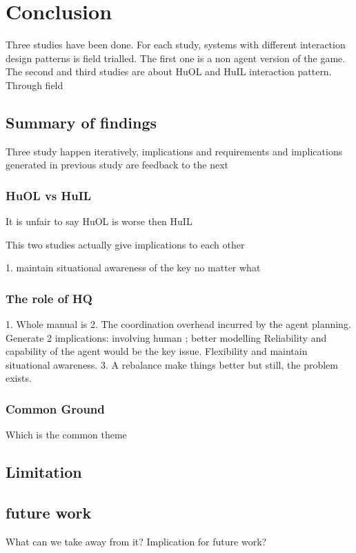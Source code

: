 \chapter{Conclusion}
Three studies have been done. For each study, systems with different interaction design patterns is field trialled. The first one is a non agent version of the game. The second and third studies are about HuOL and HuIL interaction pattern. 
Through field 
\section{Summary of findings}
Three study happen iteratively, implications and requirements and implications generated in previous study are feedback to the next 
\subsection{HuOL vs HuIL}
It is unfair to say HuOL is worse then HuIL 


This two studies actually give implications to each other 

1. maintain situational awareness of the key no matter what 

\subsection{The role of HQ}
1. Whole manual is 
2. The coordination overhead incurred by the agent planning. Generate 2 implications: involving human ; better modelling
Reliability and capability of the agent would be the key issue. Flexibility and maintain situational awareness. 
3. A rebalance make things better but still, the problem exists. 


\subsection{Common Ground}
Which is the common theme


\section{Limitation}


\section{future work}
What can we take away from it? Implication for future work? 